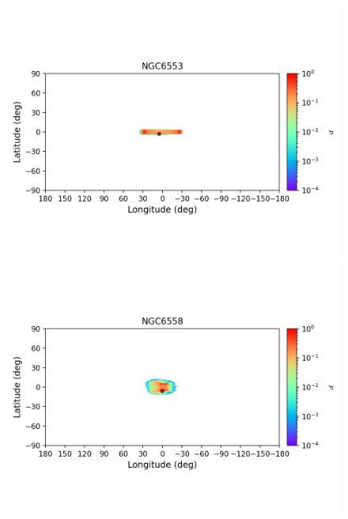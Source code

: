 \begin{figure}
\begin{center}
                \includegraphics[clip=true, trim = 0mm 20mm 0mm 10mm, width=1\columnwidth]{images/error_plots_NGC6553.png}
                \includegraphics[clip=true, trim = 0mm 20mm 0mm 10mm, width=1\columnwidth]{images/error_plots_NGC6558.png}
                

\end{center}
\end{figure}
